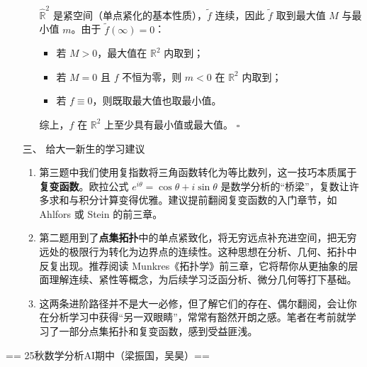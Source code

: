 \begin{enumerate}
\begin{enumerate}
$\widehat{\mathbb{R}}^2$ 是紧空间（单点紧化的基本性质），$\tilde f$ 连续，因此 $\tilde f$ 取到最大值 $M$ 与最小值 $m$。由于 $\tilde f(\infty)=0$：
\begin{itemize}
\item 若 $M>0$，最大值在 $\mathbb{R}^2$ 内取到；
\item 若 $M=0$ 且 $f$ 不恒为零，则 $m<0$ 在 $\mathbb{R}^2$ 内取到；
\item 若 $f\equiv0$，则既取最大值也取最小值。
\end{itemize}
综上，$f$ 在 $\mathbb{R}^2$ 上至少具有最小值或最大值。 \quad $\square$
\end{enumerate}

\item[三、] 给大一新生的学习建议
\begin{enumerate}
\item 第三题中我们使用复指数将三角函数转化为等比数列，这一技巧本质属于\textbf{复变函数}。欧拉公式 $e^{i\theta}=\cos\theta+i\sin\theta$ 是数学分析的“桥梁”，复数让许多求和与积分计算变得优雅。建议提前翻阅复变函数的入门章节，如 Ahlfors 或 Stein 的前三章。
\item 第二题用到了\textbf{点集拓扑}中的单点紧致化，将无穷远点补充进空间，把无穷远处的极限行为转化为边界点的连续性。这种思想在分析、几何、拓扑中反复出现。推荐阅读 Munkres《拓扑学》前三章，它将帮你从更抽象的层面理解连续、紧性等概念，为后续学习泛函分析、微分几何等打下基础。
\item 这两条进阶路径并不是大一必修，但了解它们的存在、偶尔翻阅，会让你在分析学习中获得“另一双眼睛”，常常有豁然开朗之感。笔者在考前就学习了一部分点集拓扑和复变函数，感到受益匪浅。
\end{enumerate}
\end{enumerate}

== 25秋数学分析AI期中（梁振国，吴昊）==


